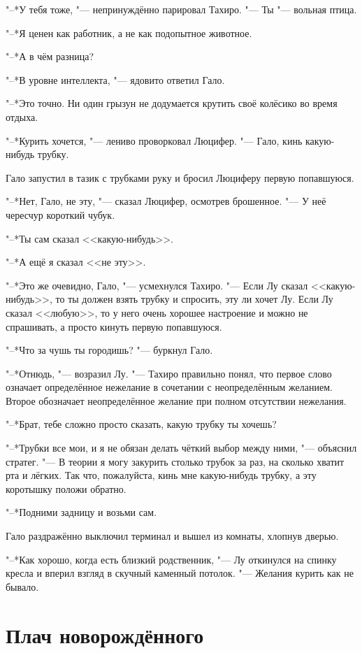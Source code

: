 \documentclass[a4paper,10pt]{book}
\begin{document}
"--*У тебя тоже, "--- непринуждённо парировал Тахиро. "--- Ты "--- вольная птица.

"--*Я ценен как работник, а не как подопытное животное.

"--*А в чём разница?

"--*В уровне интеллекта, "--- ядовито ответил Гало.

"--*Это точно. Ни один грызун не додумается крутить своё колёсико во время отдыха.

"--*Курить хочется, "--- лениво проворковал Люцифер. "--- Гало, кинь какую-нибудь трубку.

Гало запустил в тазик с трубками руку и бросил Люциферу первую попавшуюся.

"--*Нет, Гало, не эту, "--- сказал Люцифер, осмотрев брошенное. "--- У неё чересчур короткий чубук.

"--*Ты сам сказал <<какую-нибудь>>.

"--*А ещё я сказал <<не эту>>.

"--*Это же очевидно, Гало, "--- усмехнулся Тахиро. "--- Если Лу сказал <<какую-нибудь>>, то ты должен взять трубку и спросить, эту ли хочет Лу. Если Лу сказал <<любую>>, то у него очень хорошее настроение и можно не спрашивать, а просто кинуть первую попавшуюся.

"--*Что за чушь ты городишь? "--- буркнул Гало.

"--*Отнюдь, "--- возразил Лу. "--- Тахиро правильно понял, что первое слово означает определённое нежелание в сочетании с неопределённым желанием. Второе обозначает неопределённое желание при полном отсутствии нежелания.

"--*Брат, тебе сложно просто сказать, какую трубку ты хочешь?

"--*Трубки все мои, и я не обязан делать чёткий выбор между ними, "--- объяснил стратег. "--- В теории я могу закурить столько трубок за раз, на сколько хватит рта и лёгких. Так что, пожалуйста, кинь мне какую-нибудь трубку, а эту коротышку положи обратно.

"--*Подними задницу и возьми сам.

Гало раздражённо выключил терминал и вышел из комнаты, хлопнув дверью.

"--*Как хорошо, когда есть близкий родственник, "--- Лу откинулся на спинку кресла и вперил взгляд в скучный каменный потолок. "--- Желания курить как не бывало.

\section{Плач новорождённого}
\end{document}
